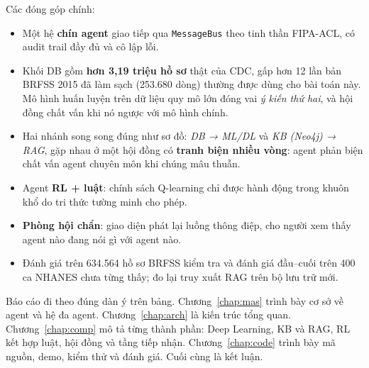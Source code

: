 Các đóng góp chính:
\begin{itemize}
  \item Một hệ \textbf{chín agent} giao tiếp qua \texttt{MessageBus} theo tinh thần FIPA-ACL, có audit trail đầy đủ và cô lập lỗi.
  \item Khối DB gồm \textbf{hơn 3,19 triệu hồ sơ} thật của CDC, gấp hơn 12 lần bản BRFSS 2015 đã làm sạch (253.680 dòng) thường được dùng cho bài toán này. Mô hình huấn luyện trên dữ liệu quy mô lớn đóng vai \emph{ý kiến thứ hai}, và hội đồng chất vấn khi nó ngược với mô hình chính.
  \item Hai nhánh song song đúng như sơ đồ: \emph{DB → ML/DL} và \emph{KB (Neo4j) → RAG}, gặp nhau ở một hội đồng có \textbf{tranh biện nhiều vòng}: agent phản biện chất vấn agent chuyên môn khi chúng mâu thuẫn.
  \item Agent \textbf{RL + luật}: chính sách Q-learning chỉ được hành động trong khuôn khổ do tri thức tường minh cho phép.
  \item \textbf{Phòng hội chẩn}: giao diện phát lại luồng thông điệp, cho người xem thấy agent nào đang nói gì với agent nào.
  \item Đánh giá trên 634.564 hồ sơ BRFSS kiểm tra và đánh giá đầu–cuối trên 400 ca NHANES chưa từng thấy; đo lại truy xuất RAG trên bộ lưu trữ mới.
\end{itemize}

Báo cáo đi theo đúng dàn ý trên bảng. Chương~\ref{chap:mas} trình bày cơ sở về agent và hệ đa agent. Chương~\ref{chap:arch} là kiến trúc tổng quan. Chương~\ref{chap:comp} mô tả từng thành phần: Deep Learning, KB và RAG, RL kết hợp luật, hội đồng và tầng tiếp nhận. Chương~\ref{chap:code} trình bày mã nguồn, demo, kiểm thử và đánh giá. Cuối cùng là kết luận.

